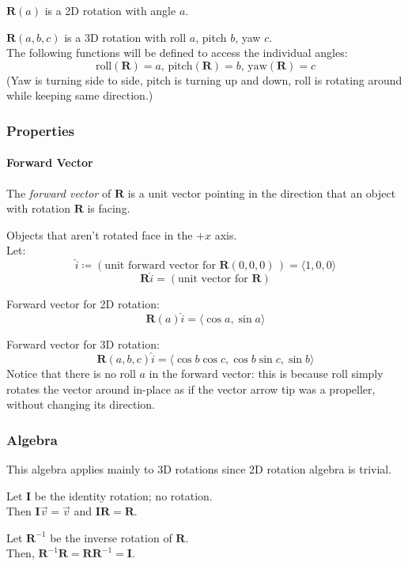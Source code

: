 \documentclass{article}
\begin{document}
$\boldsymbol{R}(a)$ is a 2D rotation with angle $a$.

$\boldsymbol{R}(a,b,c)$ is a 3D rotation with roll $a$, pitch $b$, yaw $c$. \\
The following functions will be defined to access the individual angles:
\[ \text{roll}(\boldsymbol{R})=a,\,\text{pitch}(\boldsymbol{R})=b,\,\text{yaw}(\boldsymbol{R})=c \]
(Yaw is turning side to side, pitch is turning up and down, roll is rotating around while keeping same direction.)

\subsubsection*{Properties}

\paragraph*{Forward Vector}
The \textit{forward vector} of $\boldsymbol{R}$ is a unit vector pointing in the direction that an object with rotation $\boldsymbol{R}$ is facing.

Objects that aren't rotated face in the $+x$ axis. \\
Let:
\[ \hat{i}\coloneqq(\text{unit forward vector for }\boldsymbol{R}(0,0,0)\,)=\langle1,0,0\rangle \]
\[ \boldsymbol{R}\hat{i}=(\text{unit vector for }\boldsymbol{R}) \]

Forward vector for 2D rotation:
\[ \boldsymbol{R}(a)\hat{i}=\langle \cos a,\sin a \rangle \]

Forward vector for 3D rotation:
\[ \boldsymbol{R}(a,b,c)\hat{i}=\langle \cos b\cos c,\cos b\sin c,\sin b \rangle \]
Notice that there is no roll $a$ in the forward vector: this is because roll simply rotates the vector around in-place as if the vector arrow tip was a propeller, without changing its direction.

\subsubsection*{Algebra}
This algebra applies mainly to 3D rotations since 2D rotation algebra is trivial.

Let $\boldsymbol{I}$ be the identity rotation; no rotation. \\
Then $\boldsymbol{I}\vec{v}=\vec{v}$ and $\boldsymbol{I}\boldsymbol{R}=\boldsymbol{R}$.

Let $\boldsymbol{R}^{-1}$ be the inverse rotation of $\boldsymbol{R}$. \\
Then, $\boldsymbol{R}^{-1}\boldsymbol{R}=\boldsymbol{R}\boldsymbol{R}^{-1}=\boldsymbol{I}$.
\end{document}
